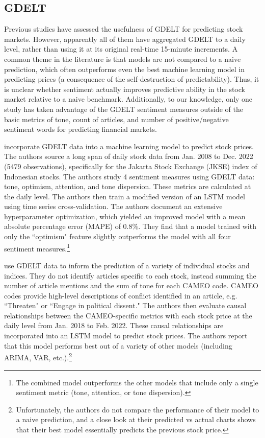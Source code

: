 \documentclass[12pt]{article}
\begin{document}
\subsection{GDELT}
Previous studies have assessed the usefulness of GDELT for predicting stock markets. However, apparently all of them have aggregated GDELT to a daily level, rather than using it at its original real-time 15-minute increments. A common theme in the literature is that models are not compared to a naive prediction, which often outperforms even the best machine learning model in predicting prices (a consequence of the self-destruction of predictability). Thus, it is unclear whether sentiment actually improves predictive ability in the stock market relative to a naive benchmark. Additionally, to our knowledge, only one study has taken advantage of the GDELT sentiment measures outside of the basic metrics of tone, count of articles, and number of positive/negative sentiment words for predicting financial markets.

\textcite{nashir2023indonesian} incorporate GDELT data into a machine learning model to predict stock prices. The authors source a long span of daily stock data from Jan. 2008 to Dec. 2022 (5479 observations), specifically for the Jakarta Stock Exchange (JKSE) index of Indonesian stocks. The authors study 4 sentiment measures using GDELT data: tone, optimism, attention, and tone dispersion. These metrics are calculated at the daily level. The authors then train a modified version of an LSTM model using time series cross-validation. The authors document an extensive hyperparameter optimization, which yielded an improved model with a mean absolute percentage error (MAPE) of 0.8\%. They find that a model trained with only the ``optimism" feature slightly outperforms the model with all four sentiment measures.\footnote{The combined model outperforms the other models that include only a single sentiment metric (tone, attention, or tone dispersion).}

\textcite{wang2024ensemble} use GDELT data to inform the prediction of a variety of individual stocks and indices. They do not identify articles specific to each stock, instead summing the number of article mentions and the sum of tone for each CAMEO code. CAMEO codes provide high-level descriptions of conflict identified in an article, e.g. ``Threaten" or ``Engage in political dissent." The authors then evaluate causal relationships between the CAMEO-specific metrics with each stock price at the daily level from Jan. 2018 to Feb. 2022. These causal relationships are incorporated into an LSTM model to predict stock prices. The authors report that this model performs best out of a variety of other models (including ARIMA, VAR, etc.).\footnote{Unfortunately, the authors do not compare the performance of their model to a naive prediction, and a close look at their predicted vs actual charts shows that their best model essentially predicts the previous stock price.}
\end{document}
